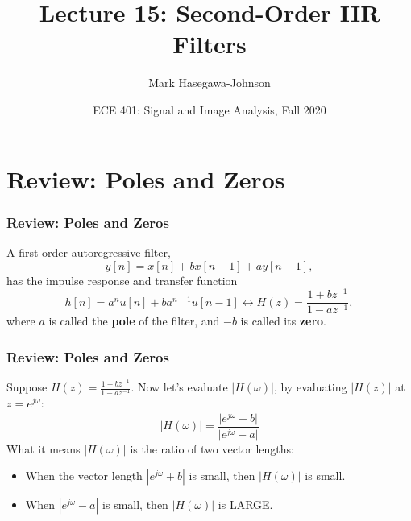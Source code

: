 \documentclass{beamer}
\title{Lecture 15: Second-Order IIR Filters}
\author{Mark Hasegawa-Johnson}
\date{ECE 401: Signal and Image Analysis, Fall 2020}
\begin{document}
\begin{frame}
  \maketitle
\end{frame}

\begin{frame}
  \tableofcontents
\end{frame}

\section[Review]{Review: Poles and Zeros}
\setcounter{subsection}{1}

\begin{frame}
  \frametitle{Review: Poles and Zeros}
  A first-order autoregressive filter,
  \[
  y[n] = x[n]+bx[n-1]+ay[n-1],
  \]
  has the impulse response and transfer function
  \[
  h[n]=a^n u[n]+ba^{n-1}u[n-1] \leftrightarrow H(z)  = \frac{1+bz^{-1}}{1-az^{-1}},
  \]
  where $a$ is called the {\bf pole} of the filter, and $-b$ is called
  its {\bf zero}.
\end{frame}

\begin{frame}
  \frametitle{Review: Poles and Zeros}

  Suppose $H(z)=\frac{1+bz^{-1}}{1-az^{-1}}$.  Now let's evaluate
  $|H(\omega)|$, by evaluating $|H(z)|$ at $z=e^{j\omega}$:
  \[
  \vert H(\omega)\vert = 
  \frac{\vert e^{j\omega}+b\vert}{\vert e^{j\omega}-a\vert}
  \]
  What it means $|H(\omega)|$ is the ratio of two vector lengths:
  \begin{itemize}
  \item When the vector length $|e^{j\omega}+b|$ is small, then
    $|H(\omega)|$ is small.
  \item When $|e^{j\omega}-a|$ is small, then $|H(\omega)|$ is LARGE.
  \end{itemize}
\end{frame}
\end{document}
